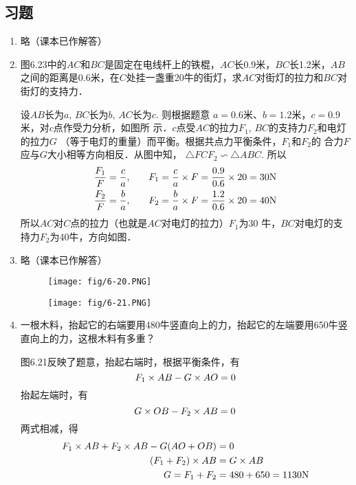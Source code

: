 \subsection{习题}
\begin{enumerate}
    \item 略（课本已作解答）

\item 图6.23中的$AC$和$BC$是固定在电线杆上的铁棍，$AC$长0.9米，$BC$长1.2米，$AB$之间的距离是0.6米，在$C$处挂一盏重20牛的街灯，求$AC$对街灯的拉力和$BC$对街灯的支持力．

\begin{solution}
    设$AB$长为$a$, $BC$长为$b$, $AC$长为$c$. 则根据题意
    $a=0.6$米、$b=1.2$米，$c=0.9$米，对$c$点作受力分析，如图所
    示．$c$点受$AC$的拉力$F_1$, $BC$的支持力$F_2$和电灯的拉力$G$
    （等于电灯的重量）而平衡。根据共点力平衡条件，$F_1$和$F_2$的
    合力$F$应与$G$大小相等方向相反．从图中知，
    $\triangle FCF_2\backsim\triangle ABC$. 所以
\[\begin{split}
    \frac{F_1}{F}=\frac{c}{a},&\qquad F_1=\frac{c}{a}\times F=\frac{0.9}{0.6}\times 20=30{\rm N}\\
    \frac{F_2}{F}=\frac{b}{a},&\qquad F_2=\frac{b}{a}\times F=\frac{1.2}{0.6}\times 20=40{\rm N}\\
\end{split}\]
    所以$AC$对$C$点的拉力（也就是$AC$对电灯的拉力）$F_1$为30
    牛，$BC$对电灯的支持力$F_2$为40牛，方向如图．
\end{solution}

\item 略（课本已作解答）

\begin{figure}[htp]
\centering
\begin{minipage}[t]{0.48\textwidth}
\centering
\texttt{[image: fig/6-20.PNG]}
\caption{}
\end{minipage}
\begin{minipage}[t]{0.48\textwidth}
\centering
\texttt{[image: fig/6-21.PNG]}
\caption{}
\end{minipage}
\end{figure}



\item 一根木料，抬起它的右端要用480牛竖直向上的力，抬起它的左端要用650牛竖直向上的力，这根木料有多重？

\begin{solution}
图6.21反映了题意，抬起右端时，根据平衡条件，有
\[F_1\times AB-G\times AO=0\]
抬起左端时，有
\[G\times OB-F_2\times AB=0\]
两式相减，得
\[\begin{split}
    F_1\times AB+F_2\times AB-G(AO+OB)&=0\\
(F_1+F_2)\times AB&=G\times AB\\
G=F_1+F_2&=480+650=1130{\rm N}
\end{split}\]


\end{solution}
\end{enumerate}
